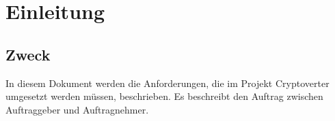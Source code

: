 \section{Einleitung}

\subsection{Zweck}
In diesem Dokument werden die Anforderungen, die im Projekt Cryptoverter umgesetzt werden müssen, beschrieben. Es beschreibt den Auftrag zwischen Auftraggeber und Auftragnehmer.
